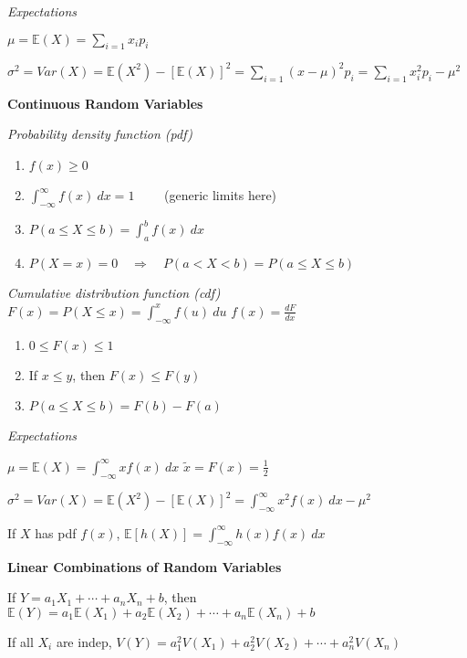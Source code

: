 \documentclass[twocolumn]{article}
\begin{document}
\textit{Expectations}

$\mu = \mathbb{E}(X) = \sum_{i=1} x_i p_i$

$\sigma^2 = Var(X) = \mathbb{E}(X^2) - [\mathbb{E}(X)]^2 = \sum_{i=1}(x - \mu)^2 p_i = \sum_{i=1}x_i^2 p_i - \mu^2$

\dotfill

\textbf{Continuous Random Variables}

\textit{Probability density function (pdf)} \vspace{-.5em}
\begin{enumerate}
    \item $f(x) \geq 0$
    \item $\int_{-\infty}^\infty f(x)\ dx = 1 \quad\quad$ (generic limits here)
    \item $P(a \leq X \leq b) = \int_a^b f(x)\ dx$
    \item $P(X=x) = 0 \quad\Rightarrow\quad P(a < X < b) = P(a \leq X \leq b)$
\end{enumerate}

\textit{Cumulative distribution function (cdf)} \\[.5em]
$F(x) = P(X \leq x) = \int_{-\infty}^x f(u)\ du$ \hfill $f(x) = \frac{dF}{dx}$
\vspace{-.5em}
\begin{enumerate}
    \item $0 \leq F(x) \leq 1$
    \item If $x \leq y$, then $F(x) \leq F(y)$
    \item $P(a \leq X \leq b) = F(b) - F(a)$
\end{enumerate}

\textit{Expectations}

$\mu = \mathbb{E}(X) = \int_{-\infty}^\infty xf(x)\ dx$ \hfill $\tilde{x} = F(x) = \frac{1}{2}$

$\sigma^2 = Var(X) = \mathbb{E}(X^2) - [\mathbb{E}(X)]^2 = \int_{-\infty}^\infty x^2 f(x)\ dx - \mu^2$

If $X$ has pdf $f(x)$, $\mathbb{E}[h(X)] = \int_{-\infty}^\infty h(x) f(x)\ dx$


\clearpage


\onecolumn


\textbf{Linear Combinations of Random Variables}

If $Y = a_1 X_1 + \cdots + a_n X_n + b$, then $\mathbb{E}(Y) = a_1 \mathbb{E}(X_1) + a_2 \mathbb{E}(X_2) + \cdots + a_n \mathbb{E}(X_n) + b$

If all $X_i$ are indep, $V(Y) = a_1^2 V(X_1) + a_2^2 V(X_2) + \cdots + a_n^2 V(X_n)$
\end{document}
